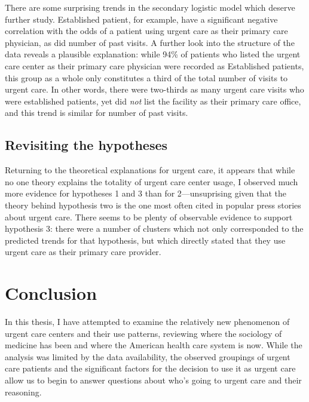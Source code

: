 \documentclass[12pt,twoside]{reedthesis}
\begin{document}
  There are some surprising trends in the secondary logistic model which
  deserve further study. Established patient, for example, have a
  significant negative correlation with the odds of a patient using urgent
  care as their primary care physician, as did number of past visits. A
  further look into the structure of the data reveals a plausible
  explanation: while 94\% of patients who listed the urgent care center as
  their primary care physician were recorded as Established patients, this
  group as a whole only constitutes a third of the total number of visits
  to urgent care. In other words, there were two-thirds as many urgent
  care visits who were established patients, yet did \emph{not} list the
  facility as their primary care office, and this trend is similar for
  number of past visits.
  
  \section*{Revisiting the hypotheses}\label{revisiting-the-hypotheses}
  
  \doublespacing
  Returning to the theoretical explanations for urgent care, it appears
  that while no one theory explains the totality of urgent care center
  usage, I observed much more evidence for hypotheses 1 and 3 than for
  2---unsuprising given that the theory behind hypothesis two is the one
  most often cited in popular press stories about urgent care. There seems
  to be plenty of observable evidence to support hypothesis 3: there were
  a number of clusters which not only corresponded to the predicted trends
  for that hypothesis, but which directly stated that they use urgent care
  as their primary care provider.
  
  \chapter*{Conclusion}\label{conclusion}
  
  \setcounter{chapter}{6} \setcounter{section}{0} \doublespacing
  
  In this thesis, I have attempted to examine the relatively new
  phenomenon of urgent care centers and their use patterns, reviewing
  where the sociology of medicine has been and where the American health
  care system is now. While the analysis was limited by the data
  availability, the observed groupings of urgent care patients and the
  significant factors for the decision to use it as urgent care allow us
  to begin to answer questions about who's going to urgent care and their
  reasoning.
  
\end{document}
